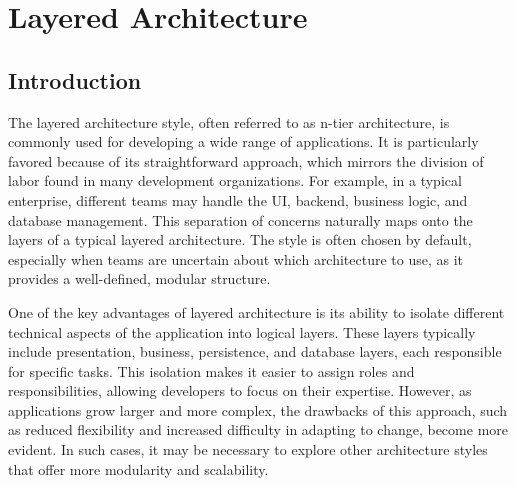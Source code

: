 \chapter{Layered Architecture}


\section{Introduction}

The layered architecture style, often referred to as n-tier architecture, is commonly used for developing a wide range of applications. It is particularly favored because of its straightforward approach, which mirrors the division of labor found in many development organizations. For example, in a typical enterprise, different teams may handle the UI, backend, business logic, and database management. This separation of concerns naturally maps onto the layers of a typical layered architecture. The style is often chosen by default, especially when teams are uncertain about which architecture to use, as it provides a well-defined, modular structure.

One of the key advantages of layered architecture is its ability to isolate different technical aspects of the application into logical layers. These layers typically include presentation, business, persistence, and database layers, each responsible for specific tasks. This isolation makes it easier to assign roles and responsibilities, allowing developers to focus on their expertise. However, as applications grow larger and more complex, the drawbacks of this approach, such as reduced flexibility and increased difficulty in adapting to change, become more evident. In such cases, it may be necessary to explore other architecture styles that offer more modularity and scalability.

